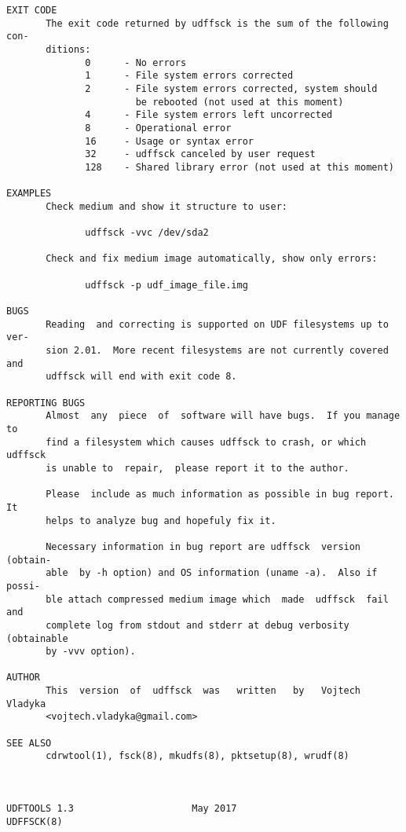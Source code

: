 \begin{Verbatim}[fontsize=\footnotesize]
EXIT CODE
       The exit code returned by udffsck is the sum of the following con-
       ditions:
              0      - No errors
              1      - File system errors corrected
              2      - File system errors corrected, system should
                       be rebooted (not used at this moment)
              4      - File system errors left uncorrected
              8      - Operational error
              16     - Usage or syntax error
              32     - udffsck canceled by user request
              128    - Shared library error (not used at this moment)

EXAMPLES
       Check medium and show it structure to user:

              udffsck -vvc /dev/sda2

       Check and fix medium image automatically, show only errors:

              udffsck -p udf_image_file.img

BUGS
       Reading  and correcting is supported on UDF filesystems up to ver-
       sion 2.01.  More recent filesystems are not currently covered  and
       udffsck will end with exit code 8.

REPORTING BUGS
       Almost  any  piece  of  software will have bugs.  If you manage to
       find a filesystem which causes udffsck to crash, or which  udffsck
       is unable to  repair,  please report it to the author.

       Please  include as much information as possible in bug report.  It
       helps to analyze bug and hopefuly fix it.

       Necessary information in bug report are udffsck  version  (obtain-
       able  by -h option) and OS information (uname -a).  Also if possi-
       ble attach compressed medium image which  made  udffsck  fail  and
       complete log from stdout and stderr at debug verbosity (obtainable
       by -vvv option).

AUTHOR
       This  version  of  udffsck  was   written   by   Vojtech   Vladyka
       <vojtech.vladyka@gmail.com>

SEE ALSO
       cdrwtool(1), fsck(8), mkudfs(8), pktsetup(8), wrudf(8)



UDFTOOLS 1.3                     May 2017                      UDFFSCK(8)
\end{Verbatim}

